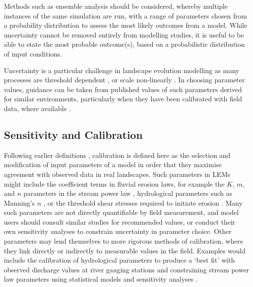 Methods such as ensemble analysis should be considered, whereby multiple instances of the same simulation are run, with a range of parameters chosen from a probability distribution to assess the most likely outcomes from a model. While uncertainty cannot be removed entirely from modelling studies, it is useful to be able to state the most probable outcome(s), based on a probabilistic distribution of input conditions.

Uncertainty is a particular challenge in landscape evolution modelling as many processes are threshold dependent \citep{snyder2003importance}, or scale non-linearly \citep{schumm1979geomorphic}. In choosing parameter values, guidance can be taken from published values of such parameters derived for similar environments, particularly when they have been calibrated with field data, where available \citep[e.g][]{Temme2011,Hancock2015,Mudd2014}.

\subsection{Sensitivity and Calibration}
Following earlier definitions \citep{oreskes1994verification,Trucano2006}, calibration is defined here as the selection and modification of input parameters of a model in order that they maximise agreement with observed data in real landscapes. Such parameters in LEMs might include the coefficient terms in fluvial erosion laws, for example the \(K\), \(m\), and \(n\) parameters in the stream power law \citep{seidl1992problem}, hydrological parameters such as Manning's \(n\) \citep{manning1890flow}, or the threshold shear stresses required to initiate erosion \citep{snyder2003importance}. Many such parameters are not directly quantifiable by field measurement, and model users should consult similar studies for recommended values, or conduct their own sensitivity analyses to constrain uncertainty in parameter choice. Other parameters may lend themselves to more rigorous methods of calibration, where they link directly or indirectly to measurable values in the field. Examples would include the calibration of hydrological parameters to produce a `best fit' with observed discharge values at river gauging stations \citep{Coulthard2013,wong2015sensitivity} and constraining stream power law parameters using statistical models and sensitivity analyses \citep{Croissant2014,Mudd2014}.

